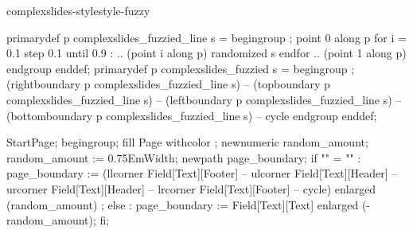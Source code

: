 \startmodule complexslides-stylestyle-fuzzy

\unprotect

\setupheader[\c!style=\bf\ssc, \c!color=foreground:1, \c!align=\v!middle, location=low]
\setupfooter[\c!style=small]

\setupheadertexts[{\getmarking[section]}]





\startMPdefinitions
  primarydef p complexslides_fuzzied_line s =
     begingroup ;
     point 0 along p 
        for i = 0.1 step 0.1 until 0.9 :
           .. (point i along p) randomized s
        endfor
           .. (point 1 along p)
     endgroup
  enddef;
  primarydef p complexslides_fuzzied s =
     begingroup ;
       (rightboundary  p complexslides_fuzzied_line s)
        -- (topboundary    p complexslides_fuzzied_line s)
        -- (leftboundary   p complexslides_fuzzied_line s)
        -- (bottomboundary p complexslides_fuzzied_line s)
        -- cycle
     endgroup
  enddef;
\stopMPdefinitions

  StartPage;
  begingroup;
  fill Page withcolor ;
  newnumeric random_amount; random_amount := 0.75EmWidth;
  newpath page_boundary; 
  if "\currentmakeup" = "" :
      page_boundary := (llcorner Field[Text][Footer]
                     -- ulcorner Field[Text][Header]
                     -- urcorner Field[Text][Header]
                     -- lrcorner Field[Text][Footer]
                     -- cycle)
                     enlarged (random_amount) ;
  else :
      page_boundary := Field[Text][Text] enlarged (-random_amount);
  fi;

